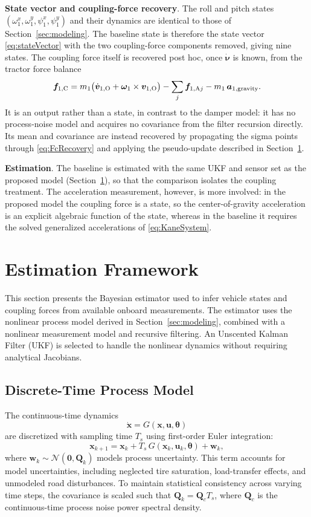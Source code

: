 \documentclass[conference]{IEEEtran}
\begin{document}
\textbf{State vector and coupling-force recovery}. The roll and pitch states $(\omega^x_1,\omega^y_1,\psi^x_1,\psi^y_1)$ and their dynamics are identical to those of Section~\ref{sec:modeling}. The baseline state is therefore the state vector \eqref{eq:stateVector} with the two coupling-force components removed, giving nine states. The coupling force itself is recovered post hoc, once $\dot{\bm\nu}$ is known, from the tractor force balance
\begin{equation}
\bm f_{1,\text{C}} = m_1\big(\dot{\bm v}_{1,\text{O}} + \bm\omega_1\times\bm v_{1,\text{O}}\big) - \sum_{j} \bm f_{1,\text{A} j} - m_1\,\bm a_{1,\text{gravity}}. \label{eq:FcRecovery}
\end{equation}
It is an output rather than a state, in contrast to the damper model: it has no process-noise model and acquires no covariance from the filter recursion directly. Its mean and covariance are instead recovered by propagating the sigma points through \eqref{eq:FcRecovery} and applying the pseudo-update described in Section~\ref{sec:estimation}.

\textbf{Estimation}. The baseline is estimated with the same UKF and sensor set as the proposed model (Section~\ref{sec:estimation}), so that the comparison isolates the coupling treatment. The acceleration measurement, however, is more involved: in the proposed model the coupling force is a state, so the center-of-gravity acceleration is an explicit algebraic function of the state, whereas in the baseline it requires the solved generalized accelerations of \eqref{eq:KaneSystem}.


\section{Estimation Framework}
\label{sec:estimation}
This section presents the Bayesian estimator used to infer vehicle states and coupling forces from available onboard measurements. The estimator uses the nonlinear process model derived in Section~\ref{sec:modeling}, combined with a nonlinear measurement model and recursive filtering. An Unscented Kalman Filter (UKF) is selected to handle the nonlinear dynamics without requiring analytical Jacobians.

\subsection{Discrete-Time Process Model}
The continuous-time dynamics
\begin{equation}
    \dot{\bm x} = G(\bm x, \bm u, \bm\theta)
\end{equation}
are discretized with sampling time $T_s$ using first-order Euler integration:
\begin{equation}
    \bm x_{k+1} = \bm x_k + T_s\,G(\bm x_k, \bm u_k, \bm\theta) + \bm w_k,
\end{equation}
where $\bm w_k \sim \mathcal{N}(\bm 0,\bm Q_k)$ models process uncertainty. This term accounts for model uncertainties, including neglected tire saturation, load-transfer effects, and unmodeled road disturbances. To maintain statistical consistency across varying time steps, the covariance is scaled such that $\bm{Q}_k = \bm{Q}_cT_s$, where $\bm{Q}_c$ is the continuous-time process noise power spectral density.
\end{document}
